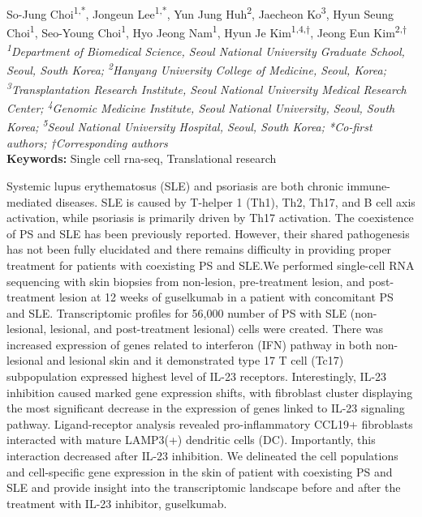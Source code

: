 \begin{center}
So-Jung Choi\textsuperscript{1,*}, Jongeun Lee\textsuperscript{1,*}, Yun Jung Huh\textsuperscript{2}, Jaecheon Ko\textsuperscript{3}, Hyun Seung Choi\textsuperscript{1}, Seo-Young Choi\textsuperscript{1}, Hyo Jeong Nam\textsuperscript{1}, Hyun Je Kim\textsuperscript{1,4,†}, Jeong Eun Kim\textsuperscript{2,†} \\
\vspace{0.2cm}
\textit{\textsuperscript{1}Department of Biomedical Science, Seoul National University Graduate School, Seoul, South Korea; \textsuperscript{2}Hanyang University College of Medicine, Seoul, Korea; \textsuperscript{3}Transplantation Research Institute, Seoul National University Medical Research Center; \textsuperscript{4}Genomic Medicine Institute, Seoul National University, Seoul, South Korea; \textsuperscript{5}Seoul National University Hospital, Seoul, South Korea; *Co-first authors; †Corresponding authors} \\
\vspace{0.2cm}
\textbf{Keywords:} Single cell rna-seq, Translational research
\end{center}

\noindent
Systemic lupus erythematosus (SLE) and psoriasis are both chronic immune-mediated diseases. SLE is caused by T-helper 1 (Th1), Th2, Th17, and B cell axis activation, while psoriasis is primarily driven by Th17 activation. The coexistence of PS and SLE has been previously reported. However, their shared pathogenesis has not been fully elucidated and there remains difficulty in providing proper treatment for patients with coexisting PS and SLE.We performed single-cell RNA sequencing with skin biopsies from non-lesion, pre-treatment lesion, and post-treatment lesion at 12 weeks of guselkumab in a patient with concomitant PS and SLE. Transcriptomic profiles for 56,000 number of PS with SLE (non-lesional, lesional, and post-treatment lesional) cells were created. There was increased expression of genes related to interferon (IFN) pathway in both non-lesional and lesional skin and it demonstrated type 17 T cell (Tc17) subpopulation expressed highest level of IL-23 receptors. Interestingly, IL-23 inhibition caused marked gene expression shifts, with fibroblast cluster displaying the most significant decrease in the expression of genes linked to IL-23 signaling pathway. Ligand-receptor analysis revealed pro-inflammatory CCL19+ fibroblasts interacted with mature LAMP3(+) dendritic cells (DC). Importantly, this interaction decreased after IL-23 inhibition. We delineated the cell populations and cell-specific gene expression in the skin of patient with coexisting PS and SLE and provide insight into the transcriptomic landscape before and after the treatment with IL-23 inhibitor, guselkumab.
\newpage

